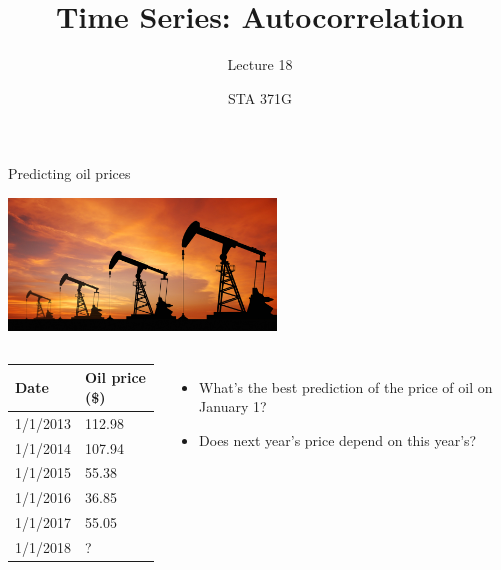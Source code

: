 \documentclass{beamer}\usepackage[]{graphicx}\usepackage[]{color}
\title{Time Series: Autocorrelation}
\subtitle{Lecture 18}
\author{STA 371G}
\begin{document}
  
  

  \frame{\maketitle}



  \begin{darkframes}
    
    \begin{frame}{Predicting oil prices}
      \fontsize{10}{10}\selectfont
      \begin{center}
        \includegraphics[width=2.8in]{pumpjack} \\
      \end{center} 
      
      \vspace{-0.1in}
      \begin{columns}[onlytextwidth]
            \begin{center}
              \begin{tabular}{ll}
              \hline
              Date & Oil price (\$) \\
              \hline
              1/1/2013 & 112.98  \\
              1/1/2014 & 107.94 \\
              1/1/2015 & 55.38 \\
              1/1/2016 & 36.85 \\
              1/1/2017 & 55.05 \\
              1/1/2018 & ? \\
              \hline 
            \end{tabular}
          \end{center} \pause
              
          \begin{itemize}[<+->]
            \item What's the best prediction of the price of oil on January 1?
            \item Does next year's price depend on this year's?
          \end{itemize}
      \end{columns}
      \lc
    \end{frame}
    

\end{darkframes}
\end{document}
